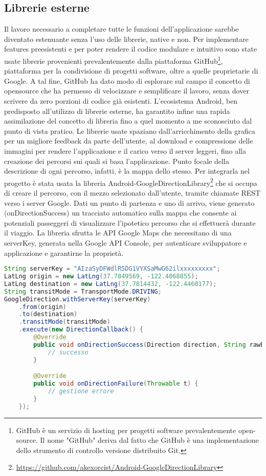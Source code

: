 \subsection{Librerie esterne}
Il lavoro necessario a completare tutte le funzioni dell'applicazione sarebbe diventato estenuante senza l'uso delle librerie, native e non.
Per implementare features preesistenti e per poter rendere il codice modulare e intuitivo sono state usate librerie provenienti prevalentemente dalla piattaforma GitHub\footnote{GitHub è un servizio di hosting per progetti software prevalentemente open-source. Il nome "GitHub" deriva dal fatto che GitHub è una implementazione dello strumento di controllo versione distribuito Git.}, piattaforma per la condivisione di progetti software, oltre a quelle proprietarie di Google. A tal fine, GitHub ha dato modo di esplorare sul campo il concetto di opensource che ha permesso di velocizzare e semplificare il lavoro, senza dover scrivere da zero porzioni di codice già esistenti. L’ecosistema Android, ben predisposto all’utilizzo di librerie esterne, ha garantito infine una rapida assimilazione del concetto di libreria fino a quel momento a me sconosciuto dal punto di vista pratico.
Le librerie usate spaziano dall’arricchimento della grafica per un migliore feedback da parte dell’utente, al download e compressione delle immagini per rendere l’applicazione e il carico verso il server leggeri, fino alla creazione dei percorsi sui quali si basa l'applicazione. Punto focale della descrizione di ogni percorso, infatti, è la mappa dello stesso.
Per integrarla nel progetto è stata usata la libreria Android-GoogleDirectionLibrary\footnote{\url{https://github.com/akexorcist/Android-GoogleDirectionLibrary}} che si occupa di creare il percorso, con il mezzo selezionato dall’utente, tramite chiamate REST verso i server Google.
Dati un punto di partenza e uno di arrivo, viene generato (onDirectionSuccess) un tracciato automatico sulla mappa che consente ai potenziali passeggeri di visualizzare l’ipotetico percorso che si effettuerà durante il viaggio.
La libreria sfrutta le API Google Maps che necessitano di una serverKey, generata nella Google API Console, per autenticare sviluppatore e applicazione e garantirne la proprietà.
\bigskip
\begin{minipage}{\linewidth}
\begin{lstlisting}[language=java, caption=Esempio integrazione Google API]
String serverKey = "AIzaSyDFWdlR5DG1VYXSaMwG62ilxxxxxxxxx";
LatLng origin = new LatLng(37.7849569, -122.4068855);
LatLng destination = new LatLng(37.7814432, -122.4460177);
String transitMode = TransportMode.DRIVING;
GoogleDirection.withServerKey(serverKey)
    .from(origin)
    .to(destination)
    .transitMode(transitMode)
    .execute(new DirectionCallback() {
        @Override
        public void onDirectionSuccess(Direction direction, String rawBody) {
            // successo 
        }

        @Override
        public void onDirectionFailure(Throwable t) {
            // gestione errore 
        }
    });
\end{lstlisting}
\end{minipage}
\FloatBarrier

